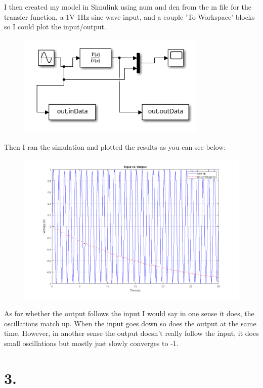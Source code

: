 \documentclass{article}
\begin{document}
I then created my model in Simulink using num and den from the m file for the transfer function, a 1V-1Hz sine wave input, and a couple 'To Workspace' blocks so I could plot the input/output.

\begin{figure}[H]
    \centering
    \includegraphics[width=0.8\textwidth]{simulinkOpenModel.png}
\end{figure}

Then I ran the simulation and plotted the results as you can see below:

\begin{figure}[H]
    \centering
    \includegraphics[width=\textwidth]{openPlot.png}
\end{figure}

As for whether the output follows the input I would say in one sense it does, the oscillations match up.
When the input goes down so does the output at the same time.
However, in another sense the output doesn't really follow the input, it does small oscillations but mostly just slowly converges to -1.

\section*{3.}
\end{document}
